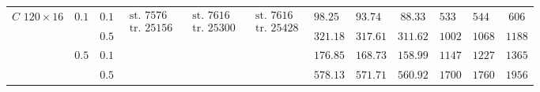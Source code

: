 \begin{table}[tp]
{\begin{tabular}{|c|c|c|c|c|c|g|h|c|g|h|c|}
       &  & $0.1$ &  &   &   & $98.25$ & $93.74$ & $88.33$ & $533$ & $544$ & $606$ \\ \hhline{|~|~|-|~|~|~|-|-|-|-|-|-|}
       & & $0.5$ & & & & $321.18$ & $317.61$ & $311.62$ & $1002$ & $1068$ & $1188$ \\ \hhline{|~|-|-|~|~|~|-|-|-|-|-|-|}
       &  & $0.1$ & & & & $176.85$ & $168.73$ & $158.99$ & $1147$ & $1227$ & $1365$\\ \hhline{|~|~|-|~|~|~|-|-|-|-|-|-|}
       & & $0.5$ & & & & $578.13$ & $571.71$ & $560.92$ & $1700$ & $1760$ & $1956$ \\ 

      \hline
    \end{tabular}
  }
\end{table}

